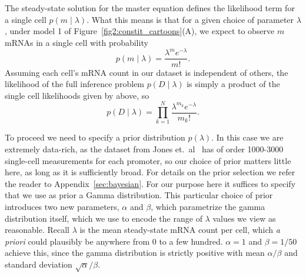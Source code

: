 The steady-state solution for the master equation defines the likelihood
term for a single cell $p(m \mid \lambda)$. What this means is that for a given
choice of parameter $\lambda$, under model 1 of
Figure~\ref{fig2:constit_cartoons}(A), we expect to observe $m$ mRNAs in a
single cell with probability
\begin{equation}
p(m\mid\lambda) = \frac{\lambda^m e^{-\lambda}}{m!}.
\label{eq:poisson_inference010}
\end{equation}
Assuming each cell's mRNA count in our dataset is independent of others, the
likelihood of the full inference problem $p(D\mid\lambda)$ is simply a product
of the single cell likelihoods given by  above, so
\begin{equation}
p(D\mid\lambda) = \prod_{k=1}^N \frac{\lambda^{m_k}e^{-\lambda}}{m_k!}.
\end{equation}

To proceed we need to specify a prior distribution $p(\lambda)$. In this case we
are extremely data-rich, as the dataset from Jones et.\ al~\cite{Jones2014} has
of order 1000-3000 single-cell measurements for each promoter, so our choice of
prior matters little here, as long as it is sufficiently broad. For details on
the prior selection we refer the reader to Appendix~\ref{sec:bayesian}. For our
purpose here it suffices to specify that we use as prior a Gamma distribution.
This particular choice of prior introduces two new parameters, $\alpha$ and
$\beta$, which parametrize the gamma distribution itself, which we use to encode
the range of $\lambda$ values we view as reasonable. Recall $\lambda$ is the
mean steady-state mRNA count per cell, which \textit{a priori} could plausibly
be anywhere from 0 to a few hundred. $\alpha=1$ and $\beta=1/50$ achieve this,
since the gamma distribution is strictly positive with mean $\alpha/\beta$ and
standard deviation $\sqrt{\alpha}/\beta$.

